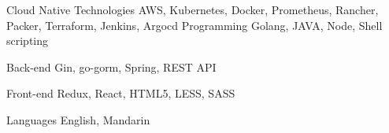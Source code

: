 

\begin{cvskills}

  \cvskill
    {Cloud Native Technologies} %
    {AWS, Kubernetes, Docker, Prometheus, Rancher, Packer, Terraform, Jenkins, Argocd} %
\cvskill
  {Programming} %
  {Golang, JAVA, Node, Shell scripting} %

  \cvskill
    {Back-end} %
    {Gin, go-gorm, Spring, REST API} %



  \cvskill
    {Front-end} %
    {Redux, React, HTML5, LESS, SASS} %

  \cvskill
    {Languages} %
    {English, Mandarin} %

\end{cvskills}
